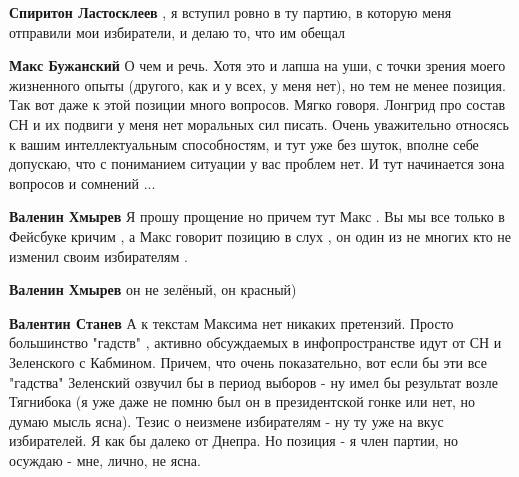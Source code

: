 \begin{itemize}
\begin{itemize}
 
\textbf{Спиритон Ластосклеев} , я вступил ровно в ту партию, в которую меня отправили мои избиратели, и делаю то, что им обещал

 
\textbf{Макс Бужанский} О чем и речь. Хотя это и лапша на уши, с точки зрения
моего жизненного опыты (другого, как и у всех, у меня нет), но тем не менее
позиция. Так вот даже к этой позиции много вопросов. Мягко говоря. Лонгрид про
состав СН и их подвиги у меня нет моральных сил писать. Очень уважительно
относясь к вашим интеллектуальным способностям, и тут уже без шуток, вполне
себе допускаю, что с пониманием ситуации у вас проблем нет. И тут начинается
зона вопросов и сомнений ...

 
\textbf{Валенин Хмырев} Я прошу прощение но причем тут Макс . Вы мы все только в Фейсбуке кричим , а Макс говорит позицию в слух , он один из не многих кто не изменил своим избирателям .

 
\textbf{Валенин Хмырев} он не зелёный, он красный)

 
\textbf{Валентин Станев} А к текстам Максима нет никаких претензий. Просто большинство "гадств" \Smiley[1.0][yellow], активно обсуждаемых в инфопространстве идут от СН и Зеленского с Кабмином. Причем, что очень показательно, вот если бы эти все "гадства" Зеленский озвучил бы в период выборов - ну имел бы результат возле Тягнибока (я уже даже не помню был он в президентской гонке или нет, но думаю мысль ясна). Тезис о неизмене избирателям - ну ту уже на вкус избирателей. Я как бы далеко от Днепра. Но позиция - я член партии, но осуждаю - мне, лично, не ясна.


\end{itemize}
\end{itemize}
